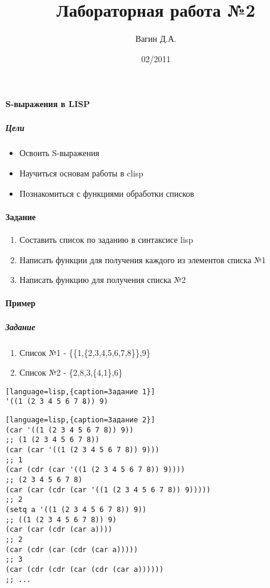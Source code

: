 \documentclass[a4paper,12pt]{article}
\title{Лабораторная работа №2}
\author{Вагин Д.А.}
\date{02/2011}
\begin{document}

\paragraph{S-выражения в LISP}
\subparagraph{Цели}
\begin{itemize}
	\item Освоить S-выражения
	\item Научиться основам работы в clisp
	\item Познакомиться с функциями обработки списков
\end{itemize}

\paragraph{Задание}
\begin{enumerate}
	\item Составить список по заданию в синтаксисе lisp
	\item Написать функции для получения каждого из элементов списка №1
	\item Написать функцию для получения списка №2
\end{enumerate}

\paragraph{Пример}
\subparagraph{Задание}
\begin{enumerate}
	\item Список №1 - \{\{1,\{2,3,4,5,6,7,8\}\},9\}
	\item Список №2 - \{2,8,3,\{4,1\},6\}
\end{enumerate}

\begin{lstlisting}[language=lisp,{caption=Задание 1}]
'((1 (2 3 4 5 6 7 8)) 9)
\end{lstlisting}

\begin{lstlisting}[language=lisp,{caption=Задание 2}]
(car '((1 (2 3 4 5 6 7 8)) 9))
;; (1 (2 3 4 5 6 7 8))
(car (car '((1 (2 3 4 5 6 7 8)) 9)))
;; 1
(car (cdr (car '((1 (2 3 4 5 6 7 8)) 9))))
;; (2 3 4 5 6 7 8)
(car (car (cdr (car '((1 (2 3 4 5 6 7 8)) 9)))))
;; 2
(setq a '((1 (2 3 4 5 6 7 8)) 9))
;; ((1 (2 3 4 5 6 7 8)) 9)
(car (car (cdr (car a))))
;; 2
(car (cdr (car (cdr (car a)))))
;; 3
(car (cdr (cdr (car (cdr (car a))))))
;; ...
\end{lstlisting}
\end{document}
